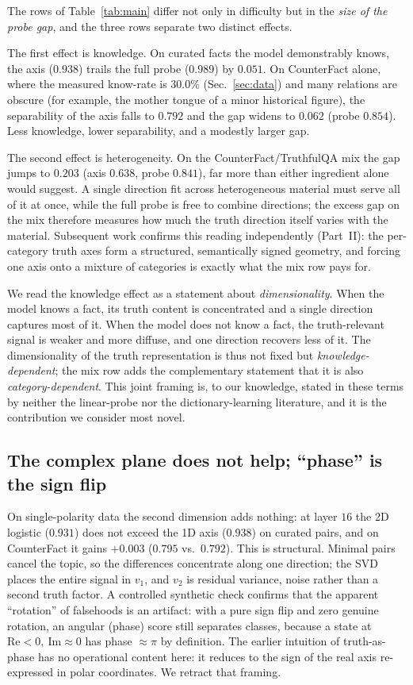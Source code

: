 \documentclass[11pt]{article}
\begin{document}
The rows of Table~\ref{tab:main} differ not only in difficulty but in the
\emph{size of the probe gap}, and the three rows separate two distinct
effects.

The first effect is knowledge. On curated facts the model demonstrably knows,
the axis ($0.938$) trails the full probe ($0.989$) by $0.051$. On CounterFact
alone, where the measured know-rate is $30.0\%$ (Sec.~\ref{sec:data}) and
many relations are obscure (for example, the mother tongue of a minor
historical figure), the separability of the axis falls to $0.792$ and the gap
widens to $0.062$ (probe $0.854$). Less knowledge, lower separability, and a
modestly larger gap.

The second effect is heterogeneity. On the CounterFact/TruthfulQA mix the gap
jumps to $0.203$ (axis $0.638$, probe $0.841$), far more than either
ingredient alone would suggest. A single direction fit across heterogeneous
material must serve all of it at once, while the full probe is free to
combine directions; the excess gap on the mix therefore measures how much the
truth direction itself varies with the material. Subsequent work confirms
this reading independently (Part~II): the
per-category truth axes form a structured, semantically signed geometry, and
forcing one axis onto a mixture of categories is exactly what the mix row
pays for.

We read the knowledge effect as a statement about \emph{dimensionality}. When
the model knows a fact, its truth content is concentrated and a single
direction captures most of it. When the model does not know a fact, the
truth-relevant signal is weaker and more diffuse, and one direction recovers
less of it. The dimensionality of the truth representation is thus not fixed
but \emph{knowledge-dependent}; the mix row adds the complementary statement
that it is also \emph{category-dependent}. This joint framing is, to our
knowledge, stated in these terms by neither the linear-probe nor the
dictionary-learning literature, and it is the contribution we consider most
novel.

\subsection{The complex plane does not help; ``phase'' is the sign flip}
\label{sec:phase}

On single-polarity data the second dimension adds nothing: at layer $16$ the
2D logistic ($0.931$) does not exceed the 1D axis ($0.938$) on curated pairs,
and on CounterFact it gains $+0.003$ ($0.795$ vs.\ $0.792$). This is
structural. Minimal pairs cancel the topic, so the differences concentrate
along one direction; the SVD places the entire signal in $v_1$, and $v_2$ is
residual variance, noise rather than a second truth factor. A controlled
synthetic check confirms that the apparent ``rotation'' of falsehoods is an
artifact: with a pure sign flip and zero genuine rotation, an angular (phase)
score still separates classes, because a state at $\mathrm{Re} < 0,\
\mathrm{Im} \approx 0$ has phase $\approx \pi$ by definition. The earlier
intuition of truth-as-phase has no operational content here: it reduces to
the sign of the real axis re-expressed in polar coordinates. We retract that
framing.
\end{document}
